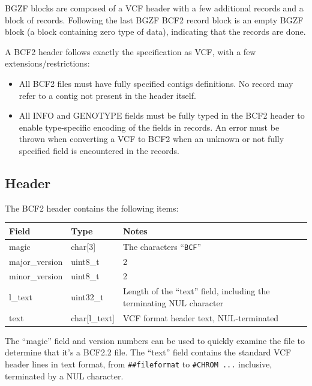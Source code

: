\documentclass[8pt]{article}
\begin{document}
BGZF blocks are composed of a VCF header with a few additional records and a block of records.
Following the last BGZF BCF2 record block is an empty BGZF block (a block containing zero type of data), indicating that the records are done.

A BCF2 header follows exactly the specification as VCF, with a few extensions/restrictions:
\begin{itemize}
  \item All BCF2 files must have fully specified contigs definitions.
  No record may refer to a contig not present in the header itself.

  \item All INFO and GENOTYPE fields must be fully typed in the BCF2 header to enable type-specific encoding of the fields in records.
  An error must be thrown when converting a VCF to BCF2 when an unknown or not fully specified field is encountered in the records.
\end{itemize}

\subsection{Header}

The BCF2 header contains the following items:

\vspace{0.3cm}
{\small
\begin{tabular}{|l | l | p{30em} | } \hline
\textbf{Field} & \textbf{Type} & \textbf{Notes} \\ \hline
magic          & char[3]     & The characters ``{\tt BCF}'' \\ \hline
major\_version & uint8\_t    & 2 \\ \hline
minor\_version & uint8\_t    & 2 \\ \hline
l\_text        & uint32\_t   & Length of the ``text'' field, including the terminating NUL character \\ \hline
text           & char[l\_text] & VCF format header text, NUL-terminated \\ \hline
\end{tabular}}
\vspace{0.3cm}

The ``magic'' field and version numbers can be used to quickly examine the file to determine that it's a BCF2.2 file.
The ``text'' field contains the standard VCF header lines in text format, from \verb|##fileformat|
to \verb|#CHROM ...| inclusive, terminated by a NUL character.
\end{document}
